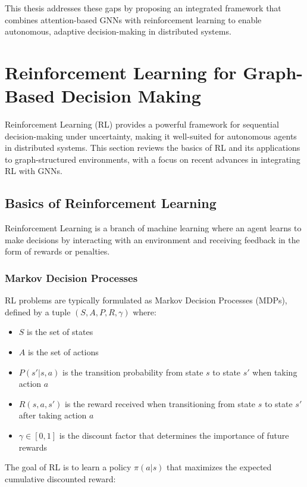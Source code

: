 \documentclass{article}
\begin{document}
This thesis addresses these gaps by proposing an integrated framework that combines attention-based GNNs with reinforcement learning to enable autonomous, adaptive decision-making in distributed systems.

\section{Reinforcement Learning for Graph-Based Decision Making}

Reinforcement Learning (RL) provides a powerful framework for sequential decision-making under uncertainty, making it well-suited for autonomous agents in distributed systems. This section reviews the basics of RL and its applications to graph-structured environments, with a focus on recent advances in integrating RL with GNNs.

\subsection{Basics of Reinforcement Learning}

Reinforcement Learning is a branch of machine learning where an agent learns to make decisions by interacting with an environment and receiving feedback in the form of rewards or penalties.

\subsubsection{Markov Decision Processes}

RL problems are typically formulated as Markov Decision Processes (MDPs), defined by a tuple $(S, A, P, R, \gamma)$ where:
\begin{itemize}
    \item $S$ is the set of states
    \item $A$ is the set of actions
    \item $P(s'|s,a)$ is the transition probability from state $s$ to state $s'$ when taking action $a$
    \item $R(s,a,s')$ is the reward received when transitioning from state $s$ to state $s'$ after taking action $a$
    \item $\gamma \in [0,1]$ is the discount factor that determines the importance of future rewards
\end{itemize}

The goal of RL is to learn a policy $\pi(a|s)$ that maximizes the expected cumulative discounted reward:
\end{document}

